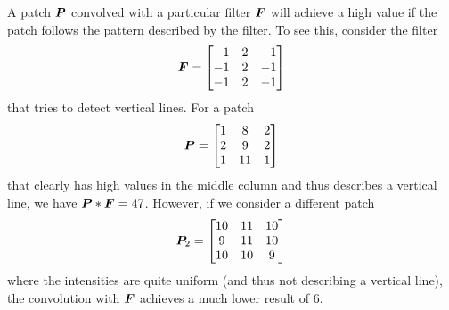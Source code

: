 \documentclass[../main.tex]{subfiles}
\begin{document}
A patch ${\bm{P}}$ convolved with a particular filter ${\bm{F}}$ will achieve a high value if the patch follows the pattern described by the filter.
To see this, consider the filter
\begin{equation*}
    {\bm{F}} = \begin{bmatrix}
        -1 & 2 & -1 \\
        -1 & 2 & -1 \\
        -1 & 2 & -1
    \end{bmatrix}
\end{equation*}
that tries to detect vertical lines.
For a patch
\begin{equation*}
    {\bm{P}} = \begin{bmatrix}
        1 & 8 & 2 \\
        2 & 9 & 2 \\
        1 & 11 & 1
    \end{bmatrix}
\end{equation*}
that clearly has high values in the middle column and thus describes a vertical line, 
we have ${\bm{P}} * {\bm{F}} = 47$. However, if we consider a different patch
\begin{equation*}
    {\bm{P}}_2 = \begin{bmatrix}
        10 & 11 & 10 \\
        9 & 11 & 10 \\
        10 & 10 & 9
    \end{bmatrix}
\end{equation*}
where the intensities are quite uniform (and thus not describing a vertical line), the convolution with ${\bm{F}}$ achieves a much lower result of $6$.
\end{document}
